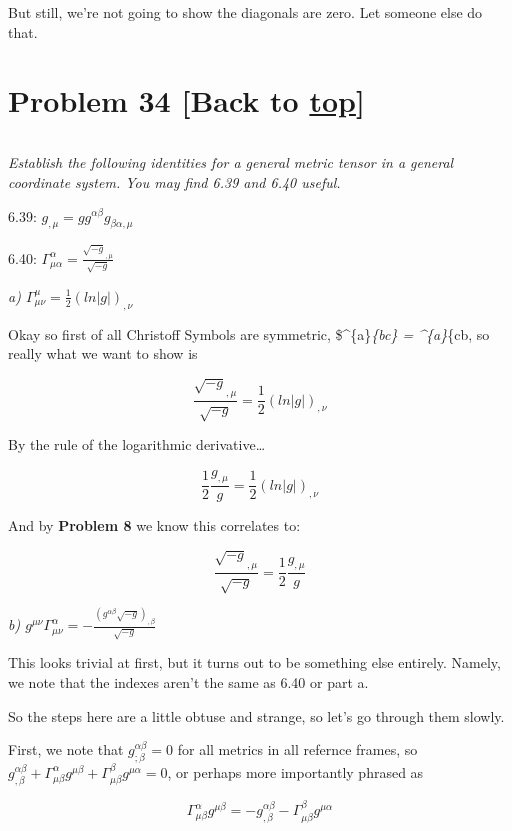 \documentclass[landscape,letterpaper,10pt,english]{article}
\begin{document}
But still, we're not going to show the diagonals are zero. Let someone
else do that.

    \hypertarget{problem-34-back-to-top}{%
\section{\texorpdfstring{Problem 34 {[}Back to
\hyperref[toc]{top}{]}}{Problem 34 {[}Back to {]}}}\label{problem-34-back-to-top}}

\[\label{P34}\]

\emph{Establish the following identities for a general metric tensor in
a general coordinate system. You may find 6.39 and 6.40 useful.}

6.39: \(g_{,\mu} = gg^{\alpha\beta}g_{\beta\alpha,\mu}\)

6.40: \(\Gamma^\alpha_{\mu\alpha} = \frac{\sqrt{-g}_{,\mu}}{\sqrt{-g}}\)

\emph{a) \(\Gamma^\mu_{\mu\nu} = \frac12 (ln|g|)_{,\nu}\)}

    Okay so first of all Christoff Symbols are symmetric,
\$\Gamma\^{}\{a\}\emph{\{bc\} = \Gamma\^{}\{a\}}\{cb, so really what we
want to show is

\[ \frac{\sqrt{-g}_{,\mu}}{\sqrt{-g}} = \frac12 (ln|g|)_{,\nu} \]

    By the rule of the logarithmic derivative\ldots{}

\[ \frac12 \frac{g_{,\mu}}{g}  = \frac12 (ln|g|)_{,\nu} \]

And by \textbf{Problem 8} we know this correlates to:

\[ \frac{\sqrt{-g}_{,\mu}}{\sqrt{-g}} = \frac12 \frac{g_{,\mu}}{g} \]

    \emph{b)
\(g^{\mu\nu}\Gamma^\alpha_{\mu\nu} = -\frac{(g^{\alpha\beta}\sqrt{-g})_{,\beta}}{\sqrt{-g}}\)}

    This looks trivial at first, but it turns out to be something else
entirely. Namely, we note that the indexes aren't the same as 6.40 or
part a.

So the steps here are a little obtuse and strange, so let's go through
them slowly.

First, we note that \(g^{\alpha\beta}_{;\beta}=0\) for all metrics in
all refernce frames, so
\(g^{\alpha\beta}_{,\beta} + \Gamma^\alpha_{\mu\beta}g^{\mu\beta} + \Gamma^\beta_{\mu\beta}g^{\mu\alpha} = 0\),
or perhaps more importantly phrased as

\[ \Gamma^\alpha_{\mu\beta}g^{\mu\beta} = - g^{\alpha\beta}_{,\beta} - \Gamma^\beta_{\mu\beta}g^{\mu\alpha} \]
\end{document}
